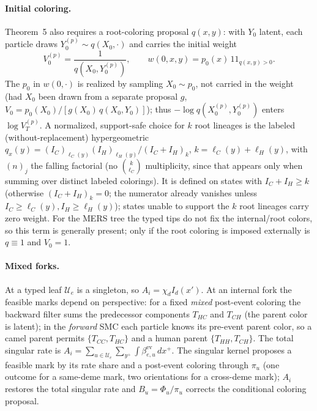 \documentclass[11pt]{article}
\newcommand{\ind}{1\!\!1}
\theoremstyle{plain}
\begin{document}
\paragraph{Initial coloring.} Theorem~5 also requires a root-coloring proposal $q(x,y)$: with $Y_0$
latent, each particle draws $Y_0^{(p)}\sim q(X_0,\cdot)$ and carries the initial weight
\[
V_0^{(p)}=\frac{1}{q\!\left(X_0,Y_0^{(p)}\right)},\qquad w(0,x,y)=p_0(x)\,\ind_{q(x,y)>0}.
\]
The $p_0$ in $w(0,\cdot)$ is realized by sampling $X_0\sim p_0$, not carried in the weight (had $X_0$
been drawn from a separate proposal $g$, $V_0=p_0(X_0)/[g(X_0)\,q(X_0,Y_0)]$); thus
$-\log q(X_0^{(p)},Y_0^{(p)})$ enters $\log V_T^{(p)}$. A normalized, support-safe choice for $k$ root
lineages is the labeled (without-replacement) hypergeometric
$q_x(y)=(I_C)_{\ell_C(y)}(I_H)_{\ell_H(y)}/(I_C{+}I_H)_k$, $k=\ell_C(y){+}\ell_H(y)$, with $(n)_j$ the
falling factorial (no $\binom{k}{\ell_C}$ multiplicity, since that appears only when summing over
distinct labeled colorings). It is defined on states with $I_C{+}I_H\ge k$ (otherwise $(I_C{+}I_H)_k=0$;
the numerator already vanishes unless $I_C\ge\ell_C(y),I_H\ge\ell_H(y)$); states unable to support the
$k$ root lineages carry zero weight. For the MERS tree the typed tips do not
fix the internal/root colors, so this term is generally present; only if the root coloring is imposed
externally is $q\equiv1$ and $V_0=1$.

\paragraph{Mixed forks.} At a typed leaf $\mathcal U_e$ is a singleton, so $A_i=\chi_d I_d(x')$. At an
internal fork the feasible marks depend on perspective: for a fixed \emph{mixed} post-event coloring the
backward filter sums the predecessor components $T_{HC}$ and $T_{CH}$ (the parent color is latent); in
the \emph{forward} SMC each particle knows its pre-event parent color, so a camel parent permits
$\{T_{CC},T_{HC}\}$ and a human parent $\{T_{HH},T_{CH}\}$. The total singular rate is
$A_i=\sum_{u\in\mathcal U_e}\sum_{y^+}\int\beta^{\mathrm{ev}}_{e,u}\,dx^+$. The singular kernel proposes
a feasible mark by its rate share and a post-event coloring through $\pi_u$ (one outcome for a same-deme
mark, two orientations for a cross-deme mark); $A_i$ restores the total singular rate and
$B_u=\Phi_u/\pi_u$ corrects the conditional coloring proposal.
\end{document}
